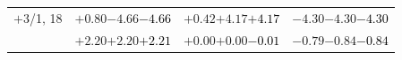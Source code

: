 \documentclass[compress]{beamer}
\begin{document}
\begin{frame}
\begin{tabular}{r | c | c | c}
$+$3/1, 18 & $+0.80$\hspace{0.1 cm}$-4.66$\hspace{0.1 cm}\textcolor{black}{$-4.66$} & $+0.42$\hspace{0.1 cm}$+4.17$\hspace{0.1 cm}\textcolor{black}{$+4.17$} & $-4.30$\hspace{0.1 cm}$-4.30$\hspace{0.1 cm}\textcolor{black}{$-4.30$} \\
           & $+2.20$\hspace{0.1 cm}$+2.20$\hspace{0.1 cm}\textcolor{black}{$+2.21$} & $+0.00$\hspace{0.1 cm}$+0.00$\hspace{0.1 cm}\textcolor{black}{$-0.01$} & $-0.79$\hspace{0.1 cm}$-0.84$\hspace{0.1 cm}\textcolor{black}{$-0.84$} \\
\end{tabular}
\end{frame}
\end{document}
